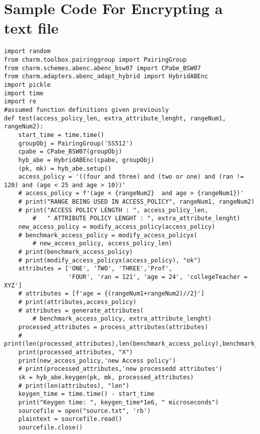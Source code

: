 
\chapter{Sample Code For Encrypting a text file}

\begin{lstlisting}[style=mystyle, caption={Sample Code For Ecrypting a File}, label=yourlabel]
import random
from charm.toolbox.pairinggroup import PairingGroup
from charm.schemes.abenc.abenc_bsw07 import CPabe_BSW07
from charm.adapters.abenc_adapt_hybrid import HybridABEnc
import pickle
import time
import re
#assumed function definitions given previously
def test(access_policy_len, extra_attribute_lenght, rangeNum1, rangeNum2):
    start_time = time.time()
    groupObj = PairingGroup('SS512')
    cpabe = CPabe_BSW07(groupObj)
    hyb_abe = HybridABEnc(cpabe, groupObj)
    (pk, mk) = hyb_abe.setup()
    access_policy = '((four and three) and (two or one) and (ran != 120) and (age < 25 and age > 10))'
    # access_policy = f'(age < {rangeNum2}  and age > {rangeNum1})'
    # print("RANGE BEING USED IN ACCESS_POLICY", rangeNum1, rangeNum2)
    # print("ACCESS POLICY LENGTH : ", access_policy_len,
        #   " ATTRIBUTE POLICY LENGHT : ", extra_attribute_lenght)
    new_access_policy = modify_access_policy(access_policy)
    # benchmark_access_policy = modify_access_policyx(
        # new_access_policy, access_policy_len)
    # print(benchmark_access_policy)
    # print(modify_access_policyx(access_policy), "ok")
    attributes = ['ONE', 'TWO', 'THREE','Prof',
                  'FOUR', 'ran = 121', 'age = 24', 'collegeTeacher = XYZ']
    # attributes = [f'age = {(rangeNum1+rangeNum2)//2}']
    # print(attributes,access_policy)
    # attributes = generate_attributes(
        # benchmark_access_policy, extra_attribute_lenght)
    processed_attributes = process_attributes(attributes)
    # print(len(processed_attributes),len(benchmark_access_policy),benchmark_access_policy)
    print(processed_attributes, "X")
    print(new_access_policy,'new Access policy')
    # print(processed_attributes,'new processedd attributes')
    sk = hyb_abe.keygen(pk, mk, processed_attributes)
    # print(len(attributes), "len")
    keygen_time = time.time() - start_time
    print("Keygen time: ", keygen_time*1e6, " microseconds")
    sourcefile = open("source.txt", 'rb')
    plaintext = sourcefile.read()
    sourcefile.close()


\end{lstlisting}
